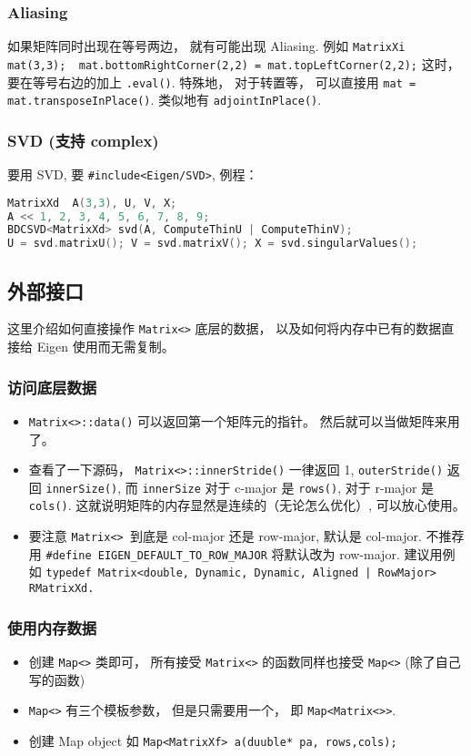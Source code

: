 \subsubsection{Aliasing}
如果矩阵同时出现在等号两边， 就有可能出现 Aliasing. 例如 \verb|MatrixXi mat(3,3);  mat.bottomRightCorner(2,2) = mat.topLeftCorner(2,2);| 这时， 要在等号右边的加上 \verb|.eval()|. 特殊地， 对于转置等， 可以直接用 \verb|mat = mat.transposeInPlace()|. 类似地有 \verb|adjointInPlace()|.

\subsubsection{SVD (支持 complex)}
要用 SVD, 要 \verb|#include<Eigen/SVD>|, 例程：
\begin{lstlisting}[language=cpp]
MatrixXd  A(3,3), U, V, X;
A << 1, 2, 3, 4, 5, 6, 7, 8, 9;
BDCSVD<MatrixXd> svd(A, ComputeThinU | ComputeThinV);
U = svd.matrixU(); V = svd.matrixV(); X = svd.singularValues();
\end{lstlisting}

\subsection{外部接口}
这里介绍如何直接操作 \verb|Matrix<>| 底层的数据， 以及如何将内存中已有的数据直接给 Eigen 使用而无需复制。

\subsubsection{访问底层数据}
\begin{itemize}
\item \verb|Matrix<>::data()| 可以返回第一个矩阵元的指针。 然后就可以当做矩阵来用了。
\item 查看了一下源码， \verb|Matrix<>::innerStride()| 一律返回 1, \verb|outerStride()| 返回 \verb|innerSize()|, 而 \verb|innerSize| 对于 c-major 是 \verb|rows()|, 对于 r-major 是 \verb|cols()|. 这就说明矩阵的内存显然是连续的（无论怎么优化）, 可以放心使用。
\item 要注意 \verb|Matrix<> |到底是 col-major 还是 row-major, 默认是 col-major. 不推荐用 \verb|#define EIGEN_DEFAULT_TO_ROW_MAJOR| 将默认改为 row-major. 建议用例如 \verb`typedef Matrix<double, Dynamic, Dynamic, Aligned | RowMajor> RMatrixXd.`
\end{itemize}

\subsubsection{使用内存数据}
\begin{itemize}
\item 创建 \verb|Map<>| 类即可， 所有接受 \verb|Matrix<>| 的函数同样也接受 \verb|Map<>| (除了自己写的函数)
\item \verb|Map<>| 有三个模板参数， 但是只需要用一个， 即 \verb|Map<Matrix<>>|.
\item 创建 Map object 如 \verb|Map<MatrixXf> a(duuble* pa, rows,cols);|
\end{itemize}

